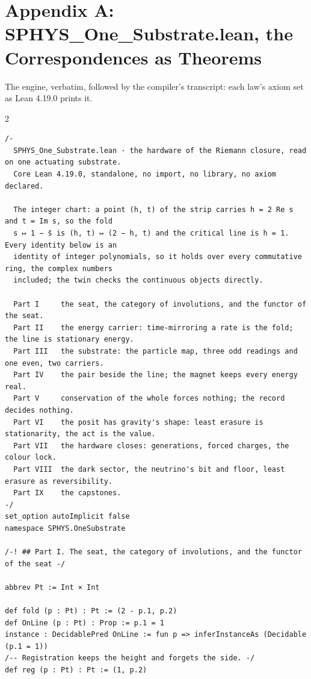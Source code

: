 \documentclass[10pt]{article}
\begin{document}
\hypertarget{appendix-a-sphys_one_substrate.lean-the-correspondences-as-theorems}{%
\section{Appendix A: SPHYS\_One\_Substrate.lean, the Correspondences as
Theorems}\label{appendix-a-sphys_one_substrate.lean-the-correspondences-as-theorems}}

The engine, verbatim, followed by the compiler's transcript: each law's
axiom set as Lean 4.19.0 prints it.

\begin{multicols}{2}
\begin{Verbatim}[fontsize=\fontsize{6.2}{7.2}\selectfont,breaklines,breakanywhere,breaksymbolleft={}]
/-
  SPHYS_One_Substrate.lean · the hardware of the Riemann closure, read on one actuating substrate.
  Core Lean 4.19.0, standalone, no import, no library, no axiom declared.

  The integer chart: a point (h, t) of the strip carries h = 2 Re s and t = Im s, so the fold
  s ↦ 1 − s̄ is (h, t) ↦ (2 − h, t) and the critical line is h = 1. Every identity below is an
  identity of integer polynomials, so it holds over every commutative ring, the complex numbers
  included; the twin checks the continuous objects directly.

  Part I     the seat, the category of involutions, and the functor of the seat.
  Part II    the energy carrier: time-mirroring a rate is the fold; the line is stationary energy.
  Part III   the substrate: the particle map, three odd readings and one even, two carriers.
  Part IV    the pair beside the line; the magnet keeps every energy real.
  Part V     conservation of the whole forces nothing; the record decides nothing.
  Part VI    the posit has gravity's shape: least erasure is stationarity, the act is the value.
  Part VII   the hardware closes: generations, forced charges, the colour lock.
  Part VIII  the dark sector, the neutrino's bit and floor, least erasure as reversibility.
  Part IX    the capstones.
-/
set_option autoImplicit false
namespace SPHYS.OneSubstrate

/-! ## Part I. The seat, the category of involutions, and the functor of the seat -/

abbrev Pt := Int × Int

def fold (p : Pt) : Pt := (2 - p.1, p.2)
def OnLine (p : Pt) : Prop := p.1 = 1
instance : DecidablePred OnLine := fun p => inferInstanceAs (Decidable (p.1 = 1))
/-- Registration keeps the height and forgets the side. -/
def reg (p : Pt) : Pt := (1, p.2)


\end{Verbatim}
\end{multicols}
\end{document}
